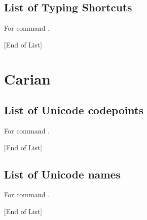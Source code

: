 \documentclass{article}
\newcommand\eolist{{\tiny [End of List]}\par}
\begin{document}
\subsection{List of Typing Shortcuts}
For command \codedetok{\brtransts{}}.
\begin{multicols}{4}\noindent
\brtag
\brshowplainlistts
\eolist
\end{multicols}
%






\section{Carian}


\subsection{List of Unicode codepoints}
For command \codedetok{\catransuc{}}.
\begin{multicols}{4}\noindent
\catag
\cashowplainlistuc
\eolist
\end{multicols}

\subsection{List of Unicode names}
For command \codedetok{\catransun{}}.
\begin{multicols}{4}\noindent
\catag
\cashowplainlistun
\eolist
\end{multicols}

%
\end{document}
